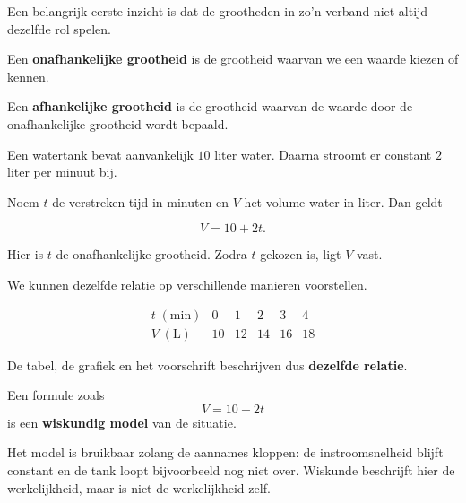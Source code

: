 \documentclass{ximera}
\begin{document}
Een belangrijk eerste inzicht is dat de grootheden in zo'n verband
niet altijd dezelfde rol spelen.

\begin{definitie}
Een \textbf{onafhankelijke grootheid} is de grootheid waarvan we een waarde
kiezen of kennen.

Een \textbf{afhankelijke grootheid} is de grootheid waarvan de waarde
door de onafhankelijke grootheid wordt bepaald.
\end{definitie}

\begin{voorbeeld}

Een watertank bevat aanvankelijk \(10\) liter water. Daarna stroomt er
constant \(2\) liter per minuut bij.

Noem \(t\) de verstreken tijd in minuten en \(V\) het volume water in liter.
Dan geldt

\[
V=10+2t.
\]

Hier is \(t\) de onafhankelijke grootheid. Zodra \(t\) gekozen is,
ligt \(V\) vast.

We kunnen dezelfde relatie op verschillende manieren voorstellen.

\[
\begin{array}{c|ccccc}
t\;(\mathrm{min}) & 0 & 1 & 2 & 3 & 4\\
\hline
V\;(\mathrm{L}) & 10 & 12 & 14 & 16 & 18
\end{array}
\]

\begin{center}
\end{center}

De tabel, de grafiek en het voorschrift beschrijven dus \textbf{dezelfde relatie}.
\end{voorbeeld}

\begin{opmerking}
Een formule zoals
\[
V=10+2t
\]
is een \textbf{wiskundig model} van de situatie.

Het model is bruikbaar zolang de aannames kloppen: de instroomsnelheid blijft
constant en de tank loopt bijvoorbeeld nog niet over. Wiskunde beschrijft hier
de werkelijkheid, maar is niet de werkelijkheid zelf.
\end{opmerking}
\end{document}
